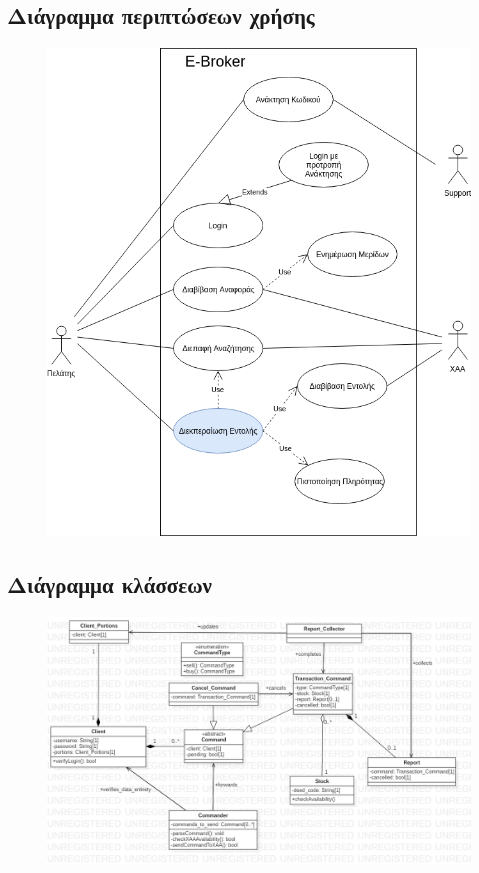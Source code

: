 \documentclass{article}
\begin{document}
\subsection{Διάγραμμα περιπτώσεων χρήσης}
\begin{figure}[!h]
	\includegraphics[width=\linewidth]{../UML/Use_Case_Diagram.png}
\end{figure}

\newpage
\subsection{Διάγραμμα κλάσσεων}
\begin{figure}[!h]
	\includegraphics[width=\linewidth]{../UML/general_class_diagram.png}
\end{figure}
\end{document}
